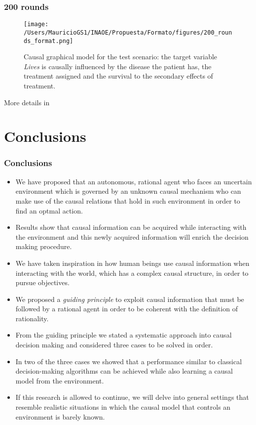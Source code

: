 \documentclass{beamer}
\theoremstyle{plain}
\begin{document}
\begin{frame}
\frametitle{200 rounds}
\begin{figure}[ht]
\vskip 0.2in
\begin{center}
\texttt{[image: /Users/MauricioGS1/INAOE/Propuesta/Formato/figures/200\_rounds\_format.png]}
\caption{Causal graphical model for the test scenario: the target variable \textit{Lives} is causally influenced by the disease the patient has, the treatment assigned and the survival to the secondary effects of treatment.}
\end{center}
\vskip -0.2in
\end{figure}
\end{frame}

\begin{frame}
More details in \cite{gonzalez2018playing}
\end{frame}

\section{Conclusions}
\begin{frame}[allowframebreaks]
\frametitle{Conclusions}
\begin{itemize}
\item We have proposed that an autonomous, rational agent who faces an uncertain environment which is governed by an unknown causal mechanism who can make use of the causal relations that hold in such environment in order to find an optmal action. 
\item Results show that causal information can be acquired while interacting with the environment and this newly acquired information will enrich the decision making procedure.
\end{itemize}
\end{frame} 
\begin{frame}[allowframebreaks]
\begin{itemize}
\item We have taken inspiration in how human beings use causal information when interacting with the world, which has a complex causal structure, in order to pursue objectives. 
\item We proposed a \textit{guiding principle} to exploit causal information that must be followed by a rational agent in order to be coherent with the definition of rationality. 
\item From the guiding principle we stated a systematic approach into causal decision making and considered three cases to be solved in order. 
\item In two of the three cases we showed that a performance similar to classical decision-making algorithms can be achieved while also learning a causal model from the environment.
\item If this research is allowed to continue, we will delve into general settings that resemble realistic situations in which the causal model that controls an environment is barely known.
\end{itemize}
\end{frame}
\end{document}
